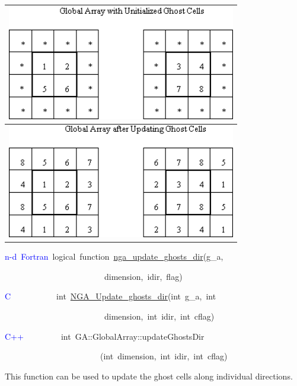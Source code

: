 \begin{tabular}{|c|}
\hline 
\includegraphics[width=10cm]{ghost012}\tabularnewline
\hline
\hline 
\includegraphics[width=10cm]{ghost015}\tabularnewline
\hline
\end{tabular}
\begin{lyxcode}
\textcolor{blue}{n-d~Fortran}~logical~function~\href{http://www.emsl.pnl.gov/docs/global/ga_ops.html\#ga_update_ghost_dir}{nga\_{}update\_{}ghosts\_{}dir}(g\_a,~

~~~~~~~~~~~~~~~~~~~~~~~~dimension,~idir,~flag)~

\textcolor{blue}{C}~~~~~~~~~~~int~\href{http://www.emsl.pnl.gov/docs/global/c_nga_ops.html\#nga_update_ghost_dir}{NGA\_{}Update\_{}ghosts\_{}dir}(int~g\_a,~int~

~~~~~~~~~~~~~~~~~~~~~~~~dimension,~int~idir,~int~cflag)~

\textcolor{blue}{C++}~~~~~~~~~int~GA::GlobalArray::updateGhostsDir

~~~~~~~~~~~~~~~~~~~~~~~(int~dimension,~int~idir,~int~cflag)~
\end{lyxcode}
This function can be used to update the ghost cells along individual
directions.

